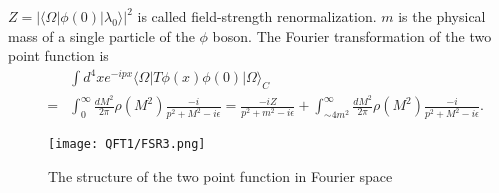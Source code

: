 $Z = |\langle \Omega | \phi(0) | \lambda_0 \rangle|^2$ is called field-strength renormalization. $m$ is the physical mass of a single particle of the $\phi$ boson. The Fourier transformation of the two point function is
\begin{eqnarray}
&\phantom{=}& \int d^4x e^{-ipx} \langle \Omega | T \phi(x) \phi(0) | \Omega \rangle_C \nonumber \\  
&=& \int_{0}^{\infty} \frac{dM^2}{2\pi} \rho(M^2) \frac{-i}{p^2+M^2-i\epsilon} = \frac{-iZ}{p^2+m^2-i\epsilon} +  \int_{\sim 4m^2}^{\infty} \frac{dM^2}{2\pi} \rho(M^2) \frac{-i}{p^2+M^2-i\epsilon} .\nonumber
\end{eqnarray}
\begin{figure}[!h]
\centering
\texttt{[image: QFT1/FSR3.png]}
\caption{The structure of the two point function in Fourier space}
\end{figure}
\vspace{80pt}

